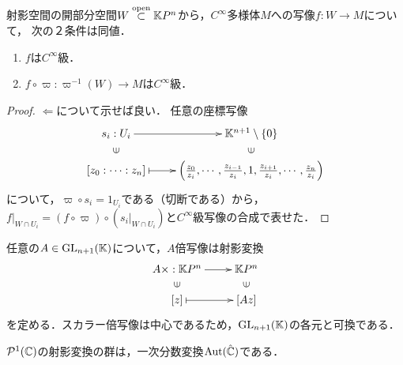 \documentclass[uplatex,dvipdfmx]{jsreport}
\begin{document}
\begin{lemma}
    射影空間の開部分空間$W\overset{\mathrm{open}}{\subset}\mathbb{K} P^n$から，$C^\infty$多様体$M$への写像$f:W\to M$について，
    次の２条件は同値．
    \begin{enumerate}
        \item $f$は$C^\infty$級．
        \item $f\circ\varpi:\varpi^{-1}(W)\to M$は$C^\infty$級．
    \end{enumerate}
\end{lemma}
\begin{proof}
    $\Leftarrow$について示せば良い．
    任意の座標写像
    \[\xymatrix@R-2pc{
        s_i:U_i\ar[r]&\K^{n+1}\setminus\{0\}\\
        \rotatebox[origin=c]{90}{$\in$}&\rotatebox[origin=c]{90}{$\in$}\\
        {[z_0:\cdots:z_{n}]}\ar@{|->}[r]&\paren{\frac{z_0}{z_i},\cdots,\frac{z_{i-1}}{z_i},1,\frac{z_{i+1}}{z_i},\cdots,\frac{z_n}{z_i}}
    }\]
    について，$\varpi\circ s_i=1_{U_i}$である（切断である）から，
    $f|_{W\cap U_i}=(f\circ\varpi)\circ(s_i|_{W\cap U_i})$と$C^\infty$級写像の合成で表せた．
\end{proof}

\begin{example}
    任意の$A\in\mathrm{GL}_{n+1}(\mathbb{K})$について，$A$倍写像は射影変換
    \[\xymatrix@R-2pc{
        A\times:\K P^n\ar[r]&\K P^n\\
        \rotatebox[origin=c]{90}{$\in$}&\rotatebox[origin=c]{90}{$\in$}\\
        [z]\ar@{|->}[r]&[Az]
    }\]
    を定める．スカラー倍写像は中心であるため，$\mathrm{GL}_{n+1}(\mathbb{K})$の各元と可換である．
\end{example}

\begin{example}
    $\mathcal{P}^1(\mathbb{C})$の射影変換の群は，一次分数変換$\mathrm{Aut}(\hat{\mathbb{C}})$である．
\end{example}
\end{document}
